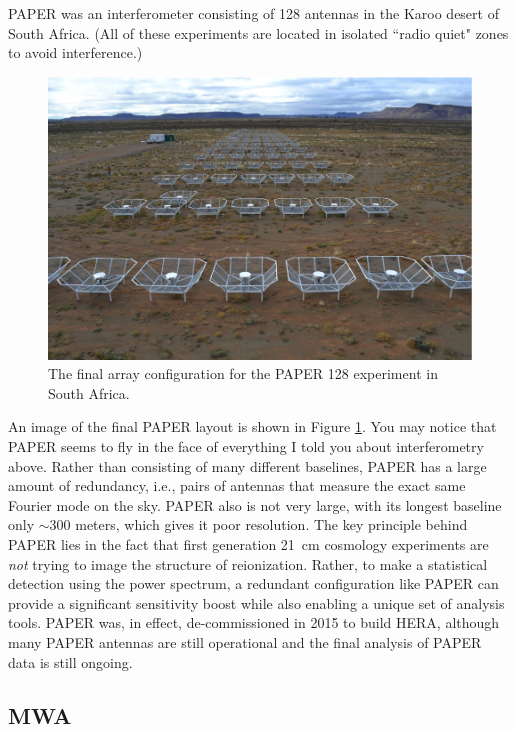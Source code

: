 PAPER was an interferometer consisting of 128 antennas in the Karoo desert of South Africa.
(All of these experiments are located in isolated ``radio quiet" zones to avoid interference.)
\begin{figure}[ht]
\centering
\includegraphics[width=4.5in]{figures/paper.png}
\caption{The final array configuration for the PAPER 128 experiment in South Africa.}
\label{fig:paper}
\end{figure}
An image of the final PAPER layout is shown in Figure \ref{fig:paper}.
You may notice that PAPER seems to fly in the face of everything I told you about interferometry
above.  Rather than consisting of many different baselines, PAPER has a large amount of 
redundancy, i.e., pairs of antennas that measure the exact same Fourier mode on the sky.
PAPER also is not very large, with its longest baseline only $\sim 300$ meters, which gives
it poor resolution.  The key principle behind PAPER lies in the fact that first generation
21\ cm cosmology experiments are \emph{not} trying to image the structure of reionization.
Rather, to make a statistical detection using the power spectrum, a redundant configuration
like PAPER can provide a significant sensitivity boost while also enabling a unique set of
analysis tools.  PAPER was, in effect, de-commissioned in 2015 to build HERA, although many
PAPER antennas are still operational and the final analysis of PAPER data is still ongoing.


\subsection{MWA}

